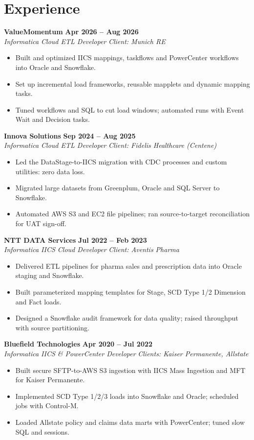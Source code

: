 \documentclass[10pt,a4paper]{article}
\newcommand{\role}[4]{%
  \vspace{4pt}\par
  \textbf{#1} \hfill \textbf{#2}\\
  \textit{#3} \hfill \textit{#4}\par}
\begin{document}
\section{Experience}

\role{ValueMomentum}{Apr 2026 -- Aug 2026}{Informatica Cloud ETL Developer}{Client: Munich RE}
\begin{itemize}
  \item Built and optimized IICS mappings, taskflows and PowerCenter workflows into Oracle and Snowflake.
  \item Set up incremental load frameworks, reusable mapplets and dynamic mapping tasks.
  \item Tuned workflows and SQL to cut load windows; automated runs with Event Wait and Decision tasks.
\end{itemize}

\role{Innova Solutions}{Sep 2024 -- Aug 2025}{Informatica Cloud ETL Developer}{Client: Fidelis Healthcare (Centene)}
\begin{itemize}
  \item Led the DataStage-to-IICS migration with CDC processes and custom utilities: zero data loss.
  \item Migrated large datasets from Greenplum, Oracle and SQL Server to Snowflake.
  \item Automated AWS S3 and EC2 file pipelines; ran source-to-target reconciliation for UAT sign-off.
\end{itemize}

\role{NTT DATA Services}{Jul 2022 -- Feb 2023}{Informatica IICS Cloud Developer}{Client: Aventis Pharma}
\begin{itemize}
  \item Delivered ETL pipelines for pharma sales and prescription data into Oracle staging and Snowflake.
  \item Built parameterized mapping templates for Stage, SCD Type 1/2 Dimension and Fact loads.
  \item Designed a Snowflake audit framework for data quality; raised throughput with source partitioning.
\end{itemize}

\role{Bluefield Technologies}{Apr 2020 -- Jul 2022}{Informatica IICS \& PowerCenter Developer}{Clients: Kaiser Permanente, Allstate}
\begin{itemize}
  \item Built secure SFTP-to-AWS S3 ingestion with IICS Mass Ingestion and MFT for Kaiser Permanente.
  \item Implemented SCD Type 1/2/3 loads into Snowflake and Oracle; scheduled jobs with Control-M.
  \item Loaded Allstate policy and claims data marts with PowerCenter; tuned slow SQL and sessions.
\end{itemize}
\end{document}
